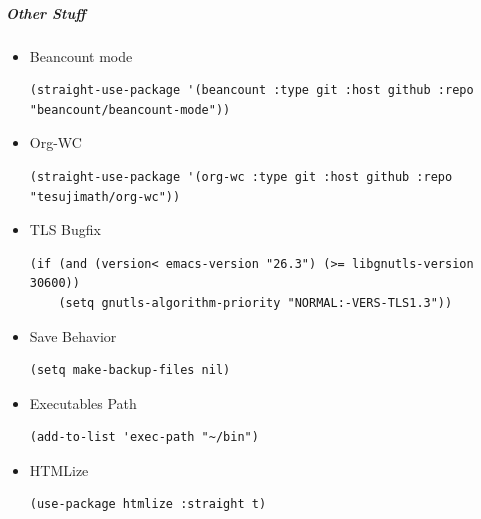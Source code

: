 \documentclass[11pt]{article}
\begin{document}
\subparagraph*{Other Stuff}
\label{sec:org4be3386}
\begin{itemize}
\item Beancount mode
\label{sec:orga29d8b6}
\begin{verbatim}
(straight-use-package '(beancount :type git :host github :repo "beancount/beancount-mode"))
\end{verbatim}
\item Org-WC
\label{sec:orgbe0a7f8}
\begin{verbatim}
(straight-use-package '(org-wc :type git :host github :repo "tesujimath/org-wc"))
\end{verbatim}

\item TLS Bugfix
\label{sec:orgb0f3d1c}
\begin{verbatim}
(if (and (version< emacs-version "26.3") (>= libgnutls-version 30600))
    (setq gnutls-algorithm-priority "NORMAL:-VERS-TLS1.3"))
\end{verbatim}
\item Save Behavior
\label{sec:org8bb1a7c}
\begin{verbatim}
(setq make-backup-files nil)
\end{verbatim}
\item Executables Path
\label{sec:org2b1ab73}
\begin{verbatim}
(add-to-list 'exec-path "~/bin")
\end{verbatim}
\item HTMLize
\label{sec:org9c8ebab}
\begin{verbatim}
(use-package htmlize :straight t)
\end{verbatim}
\end{itemize}
\end{document}
